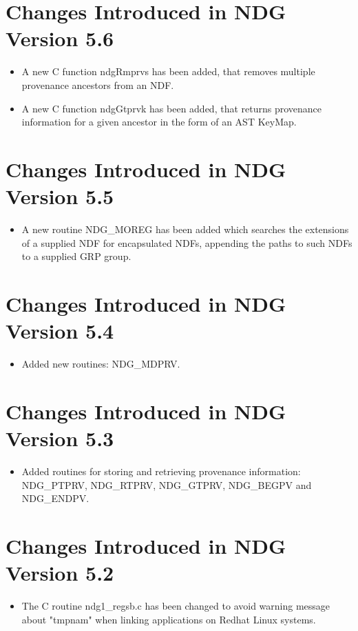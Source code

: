 \documentclass[twoside,11pt,nolof]{starlink}
\begin{document}
\section{Changes Introduced in NDG Version 5.6}
\begin{itemize}
   \item A new C function ndgRmprvs has been added, that removes multiple
         provenance ancestors from an NDF.
   \item A new C function ndgGtprvk has been added, that returns provenance
         information for a given ancestor in the form of an AST KeyMap.
\end{itemize}

\section{Changes Introduced in NDG Version 5.5}
\begin{itemize}
   \item A new routine NDG\_MOREG has been added which searches the
         extensions of a supplied NDF for encapsulated NDFs, appending
         the paths to such NDFs to a supplied GRP group.
\end{itemize}

\section{Changes Introduced in NDG Version 5.4}
\begin{itemize}
   \item Added new routines: NDG\_MDPRV.
\end{itemize}

\section{Changes Introduced in NDG Version 5.3}
\begin{itemize}
   \item Added routines for storing and retrieving provenance information:
         NDG\_PTPRV, NDG\_RTPRV, NDG\_GTPRV, NDG\_BEGPV and NDG\_ENDPV.
\end{itemize}

\section{Changes Introduced in NDG Version 5.2}
\begin{itemize}
   \item The C routine ndg1\_regsb.c has been changed to avoid warning
         message about "tmpnam" when linking applications on Redhat Linux
	 systems.
\end{itemize}
\end{document}
